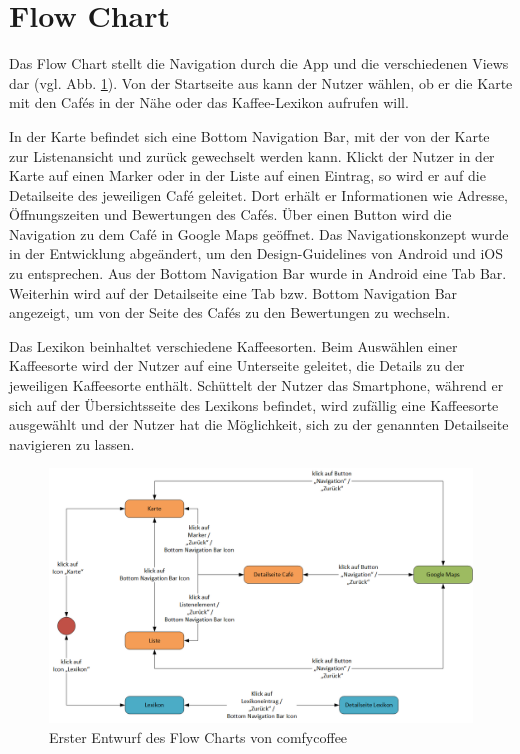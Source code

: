\section{Flow Chart}
Das Flow Chart stellt die Navigation durch die App und die verschiedenen Views dar (vgl. Abb. \ref{fig:flowchart}). Von der Startseite aus kann der Nutzer wählen, ob er die Karte mit den Cafés in der Nähe oder das Kaffee-Lexikon aufrufen will.

In der Karte befindet sich eine Bottom Navigation Bar, mit der von der Karte zur Listenansicht und zurück gewechselt werden kann. Klickt der Nutzer in der Karte auf einen Marker oder in der Liste auf einen Eintrag, so wird er auf die Detailseite des jeweiligen Café geleitet. Dort erhält er Informationen wie Adresse, Öffnungszeiten und Bewertungen des Cafés. Über einen Button wird die Navigation zu dem Café in Google Maps geöffnet. Das Navigationskonzept wurde in der Entwicklung abgeändert, um den Design-Guidelines von Android und iOS zu entsprechen. Aus der Bottom Navigation Bar wurde in Android eine Tab Bar. Weiterhin wird auf der Detailseite eine Tab bzw. Bottom Navigation Bar angezeigt, um von der Seite des Cafés zu den Bewertungen zu wechseln.

Das Lexikon beinhaltet verschiedene Kaffeesorten. Beim Auswählen einer Kaffeesorte wird der Nutzer auf eine Unterseite geleitet, die Details zu der jeweiligen Kaffeesorte enthält. Schüttelt der Nutzer das Smartphone, während er sich auf der Übersichtsseite des Lexikons befindet, wird zufällig eine Kaffeesorte ausgewählt und der Nutzer hat die Möglichkeit, sich zu der genannten Detailseite navigieren zu lassen.\newline

\begin{figure}[h!]
    \centering
		\includegraphics[width=\textwidth]{Bilder/flowchart.png}
		\caption{Erster Entwurf des Flow Charts von comfycoffee}
		\label{fig:flowchart}
\end{figure}


